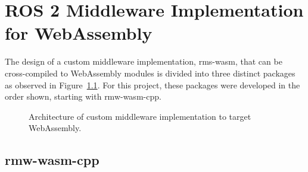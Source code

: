 \chapter{ROS 2 Middleware Implementation for WebAssembly}\label{cha:rmw}

    The design of a custom middleware implementation, \textsf{rms-wasm}, that can be cross-compiled to WebAssembly modules is divided into three distinct packages as observed in Figure~\ref{fig:rmwwasm}. For this project, these packages were developed in the order shown, starting with \textsf{rmw-wasm-cpp}.

    \begin{figure}[htbp]
        \centering
        \vspace{1em}
        \vspace{1em}
        \caption{Architecture of custom middleware implementation to target WebAssembly.}
        \label{fig:rmwwasm}
    \end{figure}

    \section{rmw-wasm-cpp}

